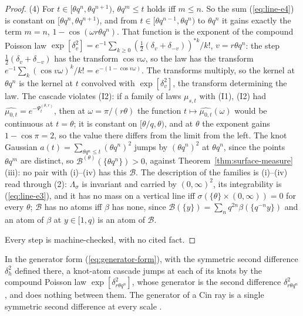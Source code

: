 \begin{proof}
(4) For $t \in [\theta q^n, \theta q^{n+1})$, $\theta q^m \le t$ holds iff $m \le n$. So the sum
(\ref{eq:line-e4}) is constant on $[\theta q^n, \theta q^{n+1})$, and from $t \in [\theta q^{n-1}, \theta q^n)$
to $\theta q^n$ it gains exactly the term $m = n$, $1 - \cos(\omega r\theta q^n)$. That function is
the exponent of the compound Poisson law
$\exp[\delta^2_v] = e^{-1}\sum_{k \ge 0}(\tfrac12(\delta_v + \delta_{-v}))^{*k}/k!$, $v = r\theta q^n$:
the step $\tfrac12(\delta_v + \delta_{-v})$ has the transform $\cos v\omega$, so the law has the
transform $e^{-1}\sum_k(\cos v\omega)^k/k! = e^{-(1 - \cos v\omega)}$. The transforms multiply, so
the kernel at $\theta q^n$ is the kernel at $t$ convolved with $\exp[\delta^2_v]$, the transform
determining the law. The cascade violates (I2): if a family of laws $\mu_{s,t}$ with (I1), (I2) had
$\widehat{\mu_{0,t}} = e^{-\Psi^{(\theta,r)}_t}$, then at $\omega = \pi/(r\theta)$ the function
$t \mapsto \widehat{\mu_{0,t}}(\omega)$ would be continuous at $t = \theta$; it is constant on
$[\theta/q, \theta)$, and at $\theta$ the exponent gains $1 - \cos\pi = 2$, so the value there differs
from the limit from the left. The knot Gaussian $a(t) = \sum_{\theta q^n \le t}(\theta q^n)^2$
jumps by $(\theta q^n)^2$ at $\theta q^n$, since the points $\theta q^m$ are distinct, so
$\mathcal{B}^{(\theta)}(\{\theta q^n\}) > 0$, against Theorem~\ref{thm:surface-measure}(iii): no pair
with (i)--(iv) has this $\mathcal{B}$. The description of the families is (i)--(iv) read through
(2): $\Lambda_\sigma$ is invariant and carried by $(0,\infty)^2$, its integrability is (\ref{eq:line-e3}), and it
has no mass on a vertical line iff $\sigma(\{\theta\} \times (0,\infty)) = 0$ for every $\theta$;
$\mathcal{B}$ has no atoms iff $\beta$ has none, since
$\mathcal{B}(\{y\}) = \sum_nq^{2n}\beta(\{q^{-n}y\})$ and an atom of $\beta$ at $y \in [1,q)$ is an
atom of $\mathcal{B}$.

Every step is machine-checked, with no cited fact.
\end{proof}

In the generator form (\ref{eq:generator-form}), with the symmetric second difference
$\delta^2_h$ defined there, a knot-atom cascade jumps at each of its knots by the compound Poisson
law $\exp[\delta^2_{r\theta q^n}]$, whose generator is the second difference $\delta^2_{r\theta q^n}$,
and does nothing between them. The generator of a Cin ray is a single symmetric second
difference at every scale .

